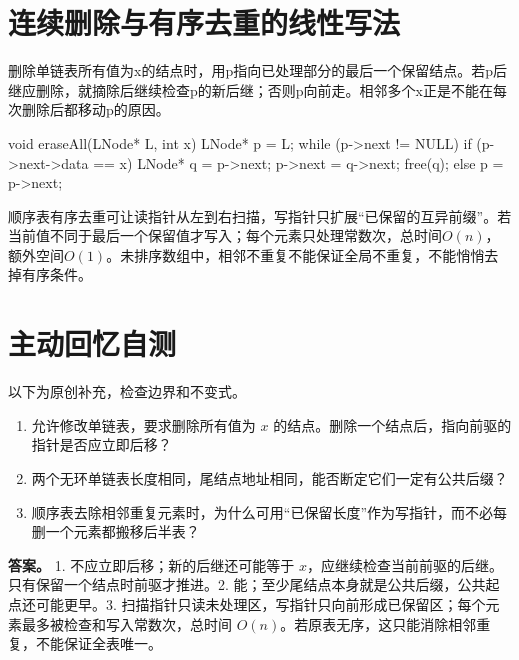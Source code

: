 \section{连续删除与有序去重的线性写法}\label{DS02-filter}

\begin{methodbox}

删除单链表所有值为x的结点时，用p指向已处理部分的最后一个保留结点。若p后继应删除，就摘除后继续检查p的新后继；否则p向前走。相邻多个x正是不能在每次删除后都移动p的原因。

\end{methodbox}

\par\medskip\noindent\begin{minipage}{\linewidth}
\begin{codeblock}[language=C++]
void eraseAll(LNode* L, int x) {
    LNode* p = L;
    while (p->next != NULL) {
        if (p->next->data == x) {
            LNode* q = p->next;
            p->next = q->next;
            free(q);
        } else {
            p = p->next;
        }
    }
}
\end{codeblock}
\end{minipage}\par\medskip

顺序表有序去重可让读指针从左到右扫描，写指针只扩展``已保留的互异前缀''。若当前值不同于最后一个保留值才写入；每个元素只处理常数次，总时间\(O(n)\)，额外空间\(O(1)\)。未排序数组中，相邻不重复不能保证全局不重复，不能悄悄去掉有序条件。

\section{主动回忆自测}\label{DS02-check}

以下为原创补充，检查边界和不变式。

\begin{enumerate}
\def\labelenumi{\arabic{enumi}.}
\tightlist
\item
  允许修改单链表，要求删除所有值为 \(x\) 的结点。删除一个结点后，指向前驱的指针是否应立即后移？
\item
  两个无环单链表长度相同，尾结点地址相同，能否断定它们一定有公共后缀？
\item
  顺序表去除相邻重复元素时，为什么可用``已保留长度''作为写指针，而不必每删一个元素都搬移后半表？
\end{enumerate}

\textbf{答案。} 1. 不应立即后移；新的后继还可能等于 \(x\)，应继续检查当前前驱的后继。只有保留一个结点时前驱才推进。2. 能；至少尾结点本身就是公共后缀，公共起点还可能更早。3. 扫描指针只读未处理区，写指针只向前形成已保留区；每个元素最多被检查和写入常数次，总时间 \(O(n)\)。若原表无序，这只能消除相邻重复，不能保证全表唯一。

